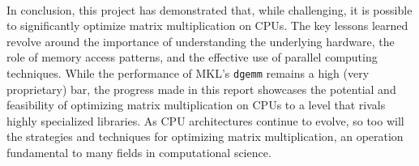 \documentclass{article}
\begin{document}
\

\noindent In conclusion, this project has demonstrated that, while challenging, it is possible to significantly optimize 
matrix multiplication on CPUs. The key lessons learned revolve around the 
importance of understanding the underlying hardware, the role of memory access patterns, 
and the effective use of parallel computing techniques. While the performance of MKL's \texttt{dgemm} remains a 
high (very proprietary) bar, the progress made in this report showcases the potential 
and feasibility of optimizing matrix multiplication on CPUs to a level that rivals highly specialized libraries. 
As CPU architectures continue to evolve, so too will the strategies and techniques for optimizing matrix multiplication, 
an operation fundamental to many fields in computational science.

\newpage
\end{document}
